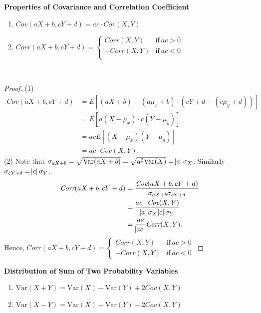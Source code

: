 \documentclass[12pt,a4paper]{article}
\newcommand{\Var}{\text{Var}}
\newcommand{\Cov}{\textit{Cov}}
\newcommand{\Corr}{\textit{Corr}}
\begin{document}
\begin{tcolorbox}[colback=white]\begin{center}\bf
		Properties of Covariance and Correlation Coefficient
	\end{center} \begin{enumerate}
	\item \(\Cov(aX+b,cY+d) = ac\cdot\Cov(X,Y) \)
	\item \(\Corr(aX+b,cY+d)=\begin{cases}
		\Corr(X,Y) &\text{if}\ ac>0 \\
		-\Corr(X,Y) &\text{if}\ ac<0 \\
	\end{cases} \)
\end{enumerate}\ \begin{proof}
	(1) \begin{align*}
		\Cov(aX+b,cY+d) &= E[(aX+b)-(a\mu_x+b)\cdot(cY+d-(c\mu_y+d))] \\
		&= E[a(X-\mu_x)\cdot c(Y-\mu_y)] \\
		&= acE[(X-\mu_x)(Y-\mu_y)] \\
		&= ac\cdot\Cov(X,Y).
	\end{align*}
	(2) Note that $\sigma_{aX+b}=\sqrt{\Var(aX+b)}=\sqrt{a^2\Var(X)}=\abs{a}\sigma_X$. Similarly $\sigma_{cY+d}=\abs{c}\sigma_Y$.\begin{align*}
		\Corr(aX+b,cY+d) &= \frac{\Cov(aX+b,cY+d)}{\sigma_{aX+b}\sigma_{cY+d}} \\
		&= \frac{ac\cdot\Cov(X,Y)}{\abs{a}\sigma_X\abs{c}\sigma_Y} \\
		&= \frac{ac}{\abs{ac}}\Corr(X,Y).
	\end{align*} Hence, $\Corr(aX+b,cY+d)=\begin{cases}
		\Corr(X,Y) &\text{if}\ ac>0 \\
		-\Corr(X,Y) &\text{if}\ ac<0
	\end{cases}$
\end{proof}
\end{tcolorbox}

\begin{tcolorbox}[colback=white]\begin{center}
		\textbf{Distribution of Sum of Two Probability Variables}
	\end{center} \begin{enumerate}
	\item \(\Var(X+Y)=\Var(X)+\Var(Y)+2\Cov(X,Y) \)
	\item \(\Var(X-Y)=\Var(X)+\Var(Y)-2\Cov(X,Y) \)
\end{enumerate}	
\end{tcolorbox}
\end{document}
